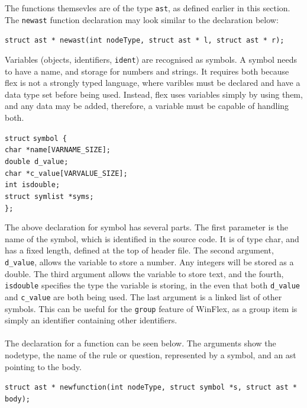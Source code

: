\documentclass[12pt]{report}
\begin{document}
The functions themsevles are of the type \texttt{ast}, as defined earlier in this section.  The \texttt{newast} function declaration may look similar to the declaration below:
\begin{center}
\texttt{struct ast * newast(int nodeType, struct ast * l, struct ast * r);}\\
\end{center}
Variables (objects, identifiers, \texttt{ident}) are recognised as symbols.  A symbol needs to have a name, and storage for numbers and strings.  It requires both because flex is not a strongly typed language, where varibles must be declared and have a data type set before being used.  Instead, flex uses variables simply by using them, and any data may be added, therefore, a variable must be capable of handling both.
\begin{tabbing}
	\texttt{struct} \= \texttt{symbol \{}\\
	\> \texttt{char *name[VARNAME\_SIZE];}\\
	\> \texttt{double d\_value;}\\
	\> \texttt{char *c\_value[VARVALUE\_SIZE];}\\
	\> \texttt{int isdouble;}\\
	\> \texttt{struct symlist *syms;}\\
	\texttt{\};}\\
\end{tabbing}
The above declaration for symbol has several parts.  The first parameter is the name of the symbol, which is identified in the source code.  It is of type char, and has a fixed length, defined at the top of header file.  The second argument, \texttt{d\_value}, allows the variable to store a number.  Any integers will be stored as a double.  The third argument allows the variable to store text, and the fourth, \texttt{isdouble} specifies the type the variable is storing, in the even that both \texttt{d\_value} and \texttt{c\_value} are both being used.  The last argument is a linked list of other symbols.  This can be useful for the \texttt{group} feature of WinFlex, as a group item is simply an identifier containing other identifiers.\\
\\
The declaration for a function can be seen below.  The arguments show the nodetype, the name of the rule or question, represented by a symbol, and an ast pointing to the body.
\begin{center}
\texttt{struct ast * newfunction(int nodeType, struct symbol *s, struct ast * body);}\\
\end{center}
\end{document}
